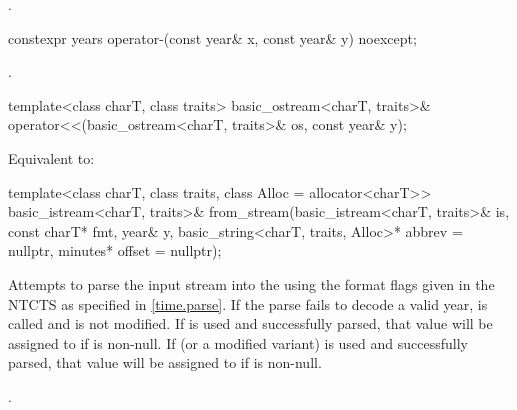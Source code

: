\begin{itemdescr}
\pnum
\returns
{}.
\end{itemdescr}

%
\begin{itemdecl}
constexpr years operator-(const year& x, const year& y) noexcept;
\end{itemdecl}

\begin{itemdescr}
\pnum
\returns
{}.
\end{itemdescr}

%
\begin{itemdecl}
template<class charT, class traits>
  basic_ostream<charT, traits>&
    operator<<(basic_ostream<charT, traits>& os, const year& y);
\end{itemdecl}

\begin{itemdescr}
\pnum
\effects
Equivalent to:
\end{itemdescr}

%
\begin{itemdecl}
template<class charT, class traits, class Alloc = allocator<charT>>
  basic_istream<charT, traits>&
    from_stream(basic_istream<charT, traits>& is, const charT* fmt,
                year& y, basic_string<charT, traits, Alloc>* abbrev = nullptr,
                minutes* offset = nullptr);
\end{itemdecl}

\begin{itemdescr}
\pnum
\effects
Attempts to parse the input stream 
into the   using
the format flags given in the NTCTS 
as specified in \ref{time.parse}.
If the parse fails to decode a valid year,
 is called and
 is not modified.
If  is used and successfully parsed,
that value will be assigned to  if  is non-null.
If  (or a modified variant) is used and successfully parsed,
that value will be assigned to  if  is non-null.

\pnum
\returns
{}.
\end{itemdescr}

